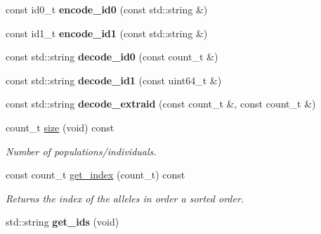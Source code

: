 \begin{DoxyCompactItemize}
\item 
\hypertarget{classmap__file_a324c76237a1041a5b9288ff40a414d0b}{const id0\-\_\-t {\bfseries encode\-\_\-id0} (const std\-::string \&)}\label{classmap__file_a324c76237a1041a5b9288ff40a414d0b}

\item 
\hypertarget{classmap__file_ae24f15d3a4a1e64df88c2a39c505388c}{const id1\-\_\-t {\bfseries encode\-\_\-id1} (const std\-::string \&)}\label{classmap__file_ae24f15d3a4a1e64df88c2a39c505388c}

\item 
\hypertarget{classmap__file_a3c3344a409f080ea3657ef39d124d7ce}{const std\-::string {\bfseries decode\-\_\-id0} (const count\-\_\-t \&)}\label{classmap__file_a3c3344a409f080ea3657ef39d124d7ce}

\item 
\hypertarget{classmap__file_a31155f69653c9113eb60b93364072c36}{const std\-::string {\bfseries decode\-\_\-id1} (const uint64\-\_\-t \&)}\label{classmap__file_a31155f69653c9113eb60b93364072c36}

\item 
\hypertarget{classmap__file_aa1c0ba91130621d7fab3d80a80e5c168}{const std\-::string {\bfseries decode\-\_\-extraid} (const count\-\_\-t \&, const count\-\_\-t \&)}\label{classmap__file_aa1c0ba91130621d7fab3d80a80e5c168}

\item 
\hypertarget{classmap__file_a90f1c7f39fdc9b0ec7f7d4b8bf21592d}{count\-\_\-t \hyperlink{classmap__file_a90f1c7f39fdc9b0ec7f7d4b8bf21592d}{size} (void) const }\label{classmap__file_a90f1c7f39fdc9b0ec7f7d4b8bf21592d}

\begin{DoxyCompactList}\small\item\em Number of populations/individuals. \end{DoxyCompactList}\item 
\hypertarget{classmap__file_ac0933417cd453a5197c131148bc60a29}{const count\-\_\-t \hyperlink{classmap__file_ac0933417cd453a5197c131148bc60a29}{get\-\_\-index} (count\-\_\-t) const }\label{classmap__file_ac0933417cd453a5197c131148bc60a29}

\begin{DoxyCompactList}\small\item\em Returns the index of the alleles in order a sorted order. \end{DoxyCompactList}\item 
\hypertarget{classmap__file_a7af25d19986211197328122d4e67a81e}{std\-::string {\bfseries get\-\_\-ids} (void)}\label{classmap__file_a7af25d19986211197328122d4e67a81e}


\end{DoxyCompactItemize}
